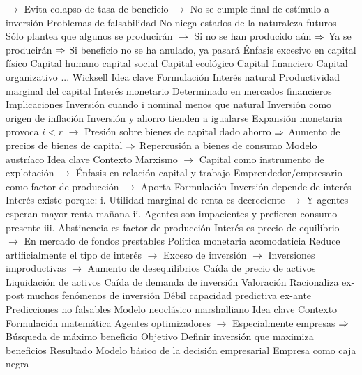 \documentclass{nuevotema}
\begin{document}
\begin{esquemal}
				\4[] $\to$ Evita colapso de tasa de beneficio
				\4[] $\to$ No se cumple final de estímulo a inversión
				\4 Problemas de falsabilidad
				\4[] No niega estados de la naturaleza futuros
				\4[] Sólo plantea que algunos se producirán
				\4[] $\to$ Si no se han producido aún
				\4[] $\Rightarrow$ Ya se producirán
				\4[] $\Rightarrow$ Si beneficio no se ha anulado, ya pasará
				\4 Énfasis excesivo en capital físico
				\4[] Capital humano
				\4[] capital social
				\4[] Capital ecológico
				\4[] Capital financiero
				\4[] Capital organizativo
				\4[] ...
		\2 Wicksell
			\3 Idea clave
			\3 Formulación
				\4 Interés natural
				\4[] Productividad marginal del capital
				\4 Interés monetario
				\4[] Determinado en mercados financieros
			\3 Implicaciones
				\4 Inversión cuando i nominal menos que natural
				\4 Inversión como origen de inflación
				\4[] Inversión y ahorro tienden a igualarse
				\4[] Expansión monetaria provoca $i < r$
				\4[] $\to$ Presión sobre bienes de capital dado ahorro
				\4[] $\Rightarrow$ Aumento de precios de bienes de capital
				\4[] $\Rightarrow$ Repercusión a bienes de consumo
		\2 Modelo austríaco
			\3 Idea clave
				\4 Contexto
				\4[] Marxismo
				\4[] $\to$ Capital como instrumento de explotación
				\4[] $\to$ Énfasis en relación capital y trabajo
				\4[] Emprendedor/empresario como factor de producción
				\4[] $\to$ Aporta
			\3 Formulación
				\4 Inversión depende de interés
				\4 Interés existe porque:
				\4[] i. Utilidad marginal de renta es decreciente
				\4[] $\to$ Y agentes esperan mayor renta mañana
				\4[] ii. Agentes son impacientes y prefieren consumo presente
				\4[] iii. Abstinencia es factor de producción
				\4 Interés es precio de equilibrio
				\4[] $\to$ En mercado de fondos prestables
				\4 Política monetaria acomodaticia
				\4[] Reduce artificialmente el tipo de interés
				\4[] $\to$ Exceso de inversión
				\4[] $\to$ Inversiones improductivas
				\4[] $\to$ Aumento de desequilibrios
				\4 Caída de precio de activos
				\4[] Liquidación de activos
				\4[] Caída de demanda de inversión
			\3 Valoración
				\4 Racionaliza ex-post muchos fenómenos de inversión
				\4 Débil capacidad predictiva ex-ante
				\4 Predicciones no falsables
		\2 Modelo neoclásico marshalliano
			\3 Idea clave
				\4 Contexto
				\4[] Formulación matemática
				\4[] Agentes optimizadores
				\4[] $\to$ Especialmente empresas
				\4[] $\Rightarrow$ Búsqueda de máximo beneficio
				\4 Objetivo
				\4[] Definir inversión que maximiza beneficios
				\4 Resultado
				\4[] Modelo básico de la decisión empresarial
				\4[] Empresa como caja negra

\end{esquemal}
\end{document}

